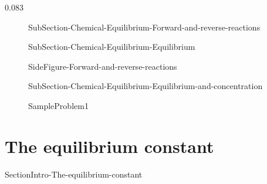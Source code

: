 0.083\documentclass[main.tex]{subfiles}
\newcommand\chapterlabel{Ch-equilibrium}\setcounter{figurenewcounter}{0}\setcounter{tablenewcounter}{0}\setcounter{formulanewcounter}{0}
\begin{document}
\sloppy\begin{description}

\item[] {SubSection-Chemical-Equilibrium-Forward-and-reverse-reactions}




\item[] {SubSection-Chemical-Equilibrium-Equilibrium}




{SideFigure-Forward-and-reverse-reactions}




\item[] {SubSection-Chemical-Equilibrium-Equilibrium-and-concentration}



  {SampleProblem1}






\end{description}

 
\section{{The equilibrium constant}}   {SectionIntro-The-equilibrium-constant}
\end{document}

